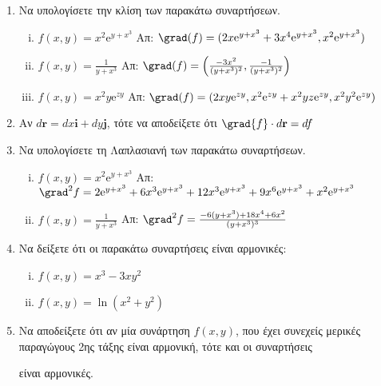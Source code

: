 \begin{enumerate}
  \item Να υπολογίσετε την κλίση των παρακάτω συναρτήσεων.
    \begin{enumerate}[i)]
      \item $ f(x,y) = x^{2} \mathrm{e}^{y+x^{3}} $ 
        \hfill Απ: $ \grad(f) = (2x\mathrm{e}^{y+x^{3}}+3x^{4}\mathrm{e}^{y+x^{3}}, 
        x^{2} \mathrm{e}^{y+x^{3}}) $ 
      \item $ f(x,y) = \frac{1}{y+x^{3}} $ 
        \hfill Απ: $\grad(f) =\left(\frac{-3x^{2}}{(y+x^{3})^{2}},
        \frac{-1}{(y+x^{3})^{2}}\right)$ 
      \item $ f(x,y) = x^{2} y \mathrm{e}^{zy}  $ 
        \hfill Απ: $ \grad(f) = (2xy\mathrm{e}^{zy},
        x^{2}\mathrm{e}^{zy}+x^{2}yz\mathrm{e}^{zy},x^{2}y^{2} \mathrm{e}^{zy})$ 
    \end{enumerate}

  \item Αν $ d\mathbf{r} = dx \mathbf{i}+ dy \mathbf{j}$, τότε να αποδείξετε ότι 
    $ \grad{f} \cdot d \mathbf{r} = df $

  \item Να υπολογίσετε τη Λαπλασιανή των παρακάτω συναρτήσεων.
    \begin{enumerate}[i)]
      \item $ f(x,y) = x^{2} \mathrm{e}^{y+x^{3}} $ 
        \hfill Απ: $ \grad^{2} f = 2 \mathrm{e}^{y+x^{3}} + 6x^{3} \mathrm{e}^{y+x^{3}} 
        + 12x^{3} \mathrm{e}^{y+x^{3}} + 9x^{6} \mathrm{e}^{y+x^{3}} + x^{2}
        \mathrm{e}^{y+x^{3}} $ 
      \item $ f(x,y) = \frac{1}{y+x^{3}} $
        \hfill Απ: $ \grad^{2}f = \frac{-6(y+x^{3})+18x^{4}+6x^{2}}{(y+x^{3})^{3}} $ 
    \end{enumerate}

  \item Να δείξετε ότι οι παρακάτω συναρτήσεις είναι αρμονικές:
    \begin{enumerate}[(i)]
      \item $ f(x,y) = x^{3}-3xy^{2} $
      \item $ f(x,y) = \ln(x^{2} + y^{2}) $
    \end{enumerate}

  \item Να αποδείξετε ότι αν μία συνάρτηση $f(x,y)$, που έχει συνεχείς 
    μερικές παραγώγους 2ης τάξης είναι αρμονική, τότε και οι συναρτήσεις 
    είναι αρμονικές.
\end{enumerate}


